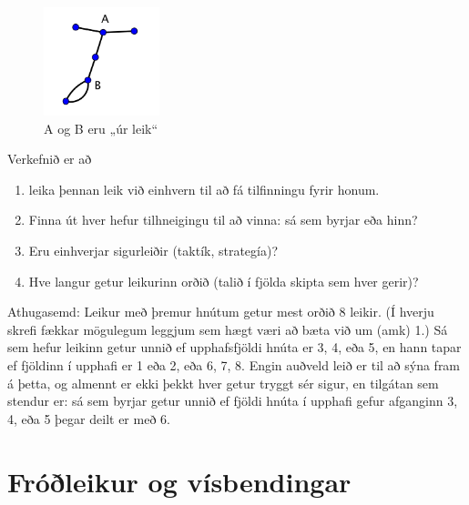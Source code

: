 \documentclass[b5paper,12pt]{book}
\begin{document}
\begin{figure}[h]
  \includegraphics[width=0.3\textwidth, center]{Myndir/Sprouts2.png}
  \caption*{A og B eru „úr leik“}
\end{figure}

Verkefnið er að 
\begin{enumerate}
\item leika þennan leik við einhvern til að fá tilfinningu fyrir honum.
\item Finna út hver hefur tilhneigingu til að vinna: sá sem byrjar eða hinn?
\item  Eru einhverjar sigurleiðir (taktík, strategía)?
\item Hve langur getur leikurinn orðið (talið í fjölda skipta sem hver gerir)?
\end{enumerate}

Athugasemd:
Leikur með þremur hnútum getur mest orðið 8 leikir. (Í hverju skrefi fækkar mögulegum leggjum sem hægt væri að bæta við um (amk) 1.) Sá sem hefur leikinn getur unnið ef upphafsfjöldi hnúta er 3, 4, eða 5, en hann tapar ef fjöldinn í upphafi er 1 eða 2, eða 6, 7, 8. Engin auðveld leið er til að sýna fram á þetta, og almennt er ekki þekkt hver getur tryggt sér sigur, en tilgátan sem stendur er: sá sem byrjar getur unnið ef fjöldi hnúta í upphafi gefur afganginn 3, 4, eða 5 þegar deilt er með 6. 





\chapter*{Fróðleikur og vísbendingar}
\label{chap:frodleikur}
\end{document}
